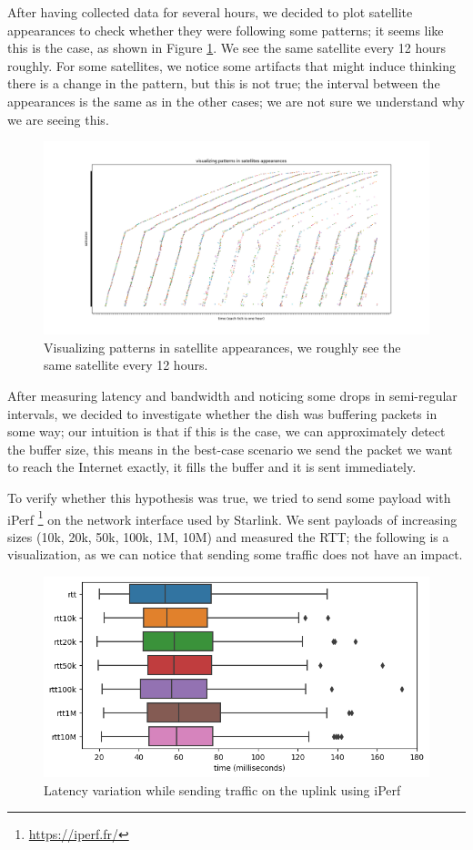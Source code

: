 \documentclass[IN,11pt,twoside,openright,idp,english]{tumthesis}
\begin{document}
After having collected data for several hours, we decided to plot satellite appearances to check whether they were following some patterns; it seems like this is the case, as shown in Figure \ref{fig:vis-sat-pat}. We see the same satellite every 12 hours roughly. For some satellites, we notice some artifacts that might induce thinking there is a change in the pattern, but this is not true; the interval between the appearances is the same as in the other cases; we are not sure we understand why we are seeing this.

\begin{figure}
    \centering
    \includegraphics[width=1.0\columnwidth]{img/visualizing-how-long-satellites-are-visible-for.png}
    \caption{Visualizing patterns in satellite appearances, we roughly see the same satellite every 12 hours.}
    \label{fig:vis-sat-pat}
\end{figure}

After measuring latency and bandwidth and noticing some drops in semi-regular intervals, we decided to investigate whether the dish was buffering packets in some way; our intuition is that if this is the case, we can approximately detect the buffer size, this means in the best-case scenario we send the packet we want to reach the Internet exactly, it fills the buffer and it is sent immediately.

To verify whether this hypothesis was true, we tried to send some payload with iPerf \footnote{\url{https://iperf.fr/}} on the network interface used by Starlink. We sent payloads of increasing sizes (10k, 20k, 50k, 100k, 1M, 10M) and measured the RTT; the following is a visualization, as we can notice that sending some traffic does not have an impact.

\begin{figure}
    \centering
    \includegraphics[width=0.6\columnwidth]{img/latency_iperf.png}
    \caption{Latency variation while sending traffic on the uplink using iPerf}
\end{figure}
\end{document}
